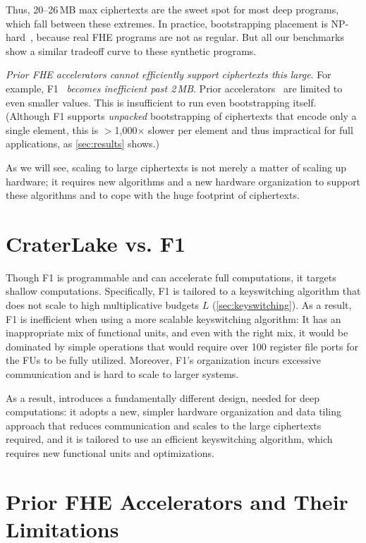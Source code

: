 Thus, 20--26\,MB max ciphertexts are the sweet spot for most deep programs,
which fall between these extremes. In practice, bootstrapping placement is
NP-hard~\cite{benhamouda2017optimization}, because real FHE programs are not as
regular. But all our benchmarks show a similar tradeoff curve to these
synthetic programs.

\figBootstrappingFrequency

\emph{Prior FHE accelerators cannot efficiently support ciphertexts this
large}. For example, F1~\cite{feldmann:micro21:f1} \emph{becomes inefficient
past 2\,MB}. Prior accelerators~\cite{riazi:asplos20:heax} are limited to even
smaller values. This is insufficient to run even bootstrapping itself.
(Although F1 supports \emph{unpacked} bootstrapping of ciphertexts that encode
only a single element, this is $>$1,000$\times$ slower per element and thus
impractical for full applications, as \autoref{sec:results} shows.)

As we will see, scaling to large ciphertexts is not merely a matter of scaling
up hardware; it requires new algorithms and a new hardware organization to
support these algorithms and to cope with the huge footprint of ciphertexts.

\section{CraterLake vs. F1}

Though F1 is programmable and can accelerate full computations, it targets
shallow computations. Specifically, F1 is tailored to a keyswitching algorithm
that does not scale to high multiplicative budgets $L$
(\autoref{sec:keyswitching}). As a result, F1 is inefficient when using a more
scalable keyswitching algorithm: It has an inappropriate mix of functional
units, and even with the right mix, it would be dominated by simple operations
that would require over 100 register file ports for the FUs to be fully
utilized. Moreover, F1's organization incurs excessive communication and is
hard to scale to larger systems.

As a result, \name introduces a fundamentally different design, needed for deep
computations: it adopts a new, simpler hardware organization and data tiling
approach that reduces communication and scales to the large ciphertexts
required, and it is tailored to use an efficient keyswitching algorithm, which
requires new functional units and optimizations.

\section{Prior FHE Accelerators and Their Limitations}\label{sec:drawbacks}



